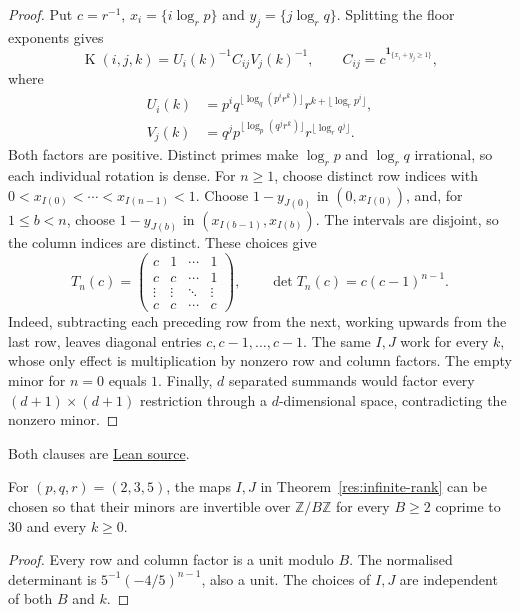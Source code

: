 \documentclass[11pt]{article}
\newcommand{\Kernel}{\operatorname{K}}
\begin{document}
\begin{proof}
Put $c=r^{-1}$, $x_i=\{i\log_r p\}$ and $y_j=\{j\log_r q\}$.
Splitting the floor exponents gives
\[
 \Kernel(i,j,k)=U_i(k)^{-1}C_{ij}V_j(k)^{-1},\qquad
 C_{ij}=c^{\mathbf1_{\{x_i+y_j\ge1\}}},
\]
where
\[
\begin{aligned}
 U_i(k)&=p^i q^{\lfloor\log_q(p^ir^k)\rfloor}
            r^{k+\lfloor\log_r p^i\rfloor},\\
 V_j(k)&=q^j p^{\lfloor\log_p(q^jr^k)\rfloor}
            r^{\lfloor\log_r q^j\rfloor}.
\end{aligned}
\]
Both factors are positive.  Distinct primes make $\log_r p$ and
$\log_r q$ irrational, so each individual rotation is dense.
For $n\ge1$, choose distinct row indices with
$0<x_{I(0)}<\cdots<x_{I(n-1)}<1$.
Choose $1-y_{J(0)}$ in $(0,x_{I(0)})$, and, for $1\le b<n$,
choose $1-y_{J(b)}$ in
$(x_{I(b-1)},x_{I(b)})$.  The intervals are disjoint, so the column
indices are distinct.  These choices give
\[
 T_n(c)=\begin{pmatrix}
 c&1&\cdots&1\\
 c&c&\cdots&1\\
 \vdots&\vdots&\ddots&\vdots\\
 c&c&\cdots&c
 \end{pmatrix},\qquad
 \det T_n(c)=c(c-1)^{n-1}.
\]
Indeed, subtracting each preceding row from the next, working upwards from
the last row, leaves diagonal entries $c,c-1,\ldots,c-1$.
The same $I,J$ work for every $k$, whose only effect is multiplication by
nonzero row and column factors.  The empty minor for $n=0$ equals $1$.
Finally, $d$ separated summands would factor every $(d+1)\times(d+1)$
restriction through a $d$-dimensional space, contradicting the nonzero minor.
\end{proof}

\noindent Both clauses are \href{https://github.com/wcook04/plectis-erdos/blob/f36a98bf3d3e6f65f1074e3b800e3293d5b8a51a/ErdosProblems/Erdos269/PaperR7BasicAssembly.lean#L22}{Lean source}.

\begin{corollary}
\label{res:admissible-modular-minors}
For $(p,q,r)=(2,3,5)$, the maps $I,J$ in
Theorem~\ref{res:infinite-rank} can be chosen so that their minors are
invertible over $\mathbb Z/B\mathbb Z$ for every $B\ge2$ coprime to $30$
and every $k\ge0$.
\end{corollary}
\begin{proof}
Every row and column factor is a unit modulo $B$.  The normalised determinant
is $5^{-1}(-4/5)^{n-1}$, also a unit.  The choices of $I,J$ are independent
of both $B$ and $k$.
\end{proof}
\end{document}

